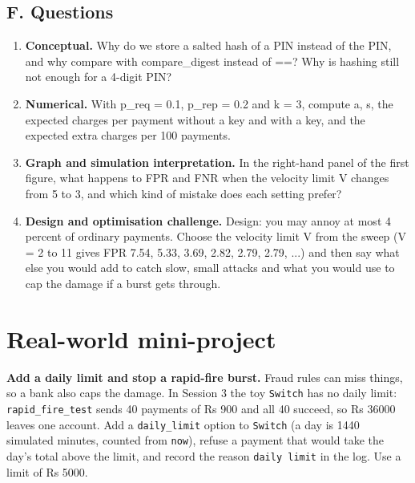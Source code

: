 \documentclass[11pt,a4paper]{article}
\begin{document}
\subsection*{F. Questions}
\begin{enumerate}[nosep]
\item \textbf{Conceptual.} Why do we store a salted hash of a PIN instead of the PIN, and why compare with compare\_digest instead of ==? Why is hashing still not enough for a 4-digit PIN?
\item \textbf{Numerical.} With p\_req = 0.1, p\_rep = 0.2 and k = 3, compute a, s, the expected charges per payment without a key and with a key, and the expected extra charges per 100 payments.
\item \textbf{Graph and simulation interpretation.} In the right-hand panel of the first figure, what happens to FPR and FNR when the velocity limit V changes from 5 to 3, and which kind of mistake does each setting prefer?
\item \textbf{Design and optimisation challenge.} Design: you may annoy at most 4 percent of ordinary payments. Choose the velocity limit V from the sweep (V = 2 to 11 gives FPR 7.54, 5.33, 3.69, 2.82, 2.79, 2.79, ...) and then say what else you would add to catch slow, small attacks and what you would use to cap the damage if a burst gets through.
\end{enumerate}

\section{Real-world mini-project}
\textbf{Add a daily limit and stop a rapid-fire burst.} Fraud rules can miss things, so a bank also caps the damage. In Session 3 the toy \texttt{Switch} has no daily limit: \texttt{rapid\_fire\_test} sends 40 payments of Rs 900 and all 40 succeed, so Rs 36000 leaves one account. Add a \texttt{daily\_limit} option to \texttt{Switch} (a day is 1440 simulated minutes, counted from \texttt{now}), refuse a payment that would take the day's total above the limit, and record the reason \texttt{daily limit} in the log. Use a limit of Rs 5000.
\end{document}
